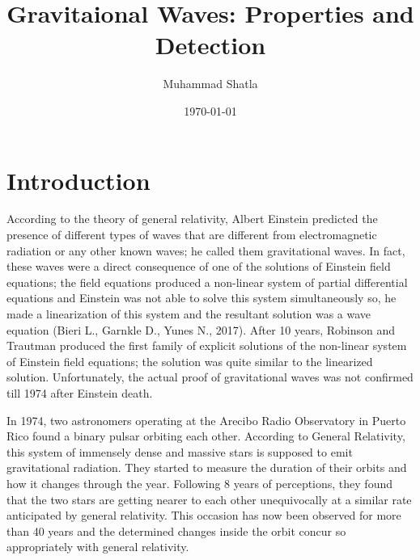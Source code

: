 \documentclass[11]{article}
\begin{document}
\vspace{5cm}
\title{Gravitaional Waves: Properties and Detection}
\author{Muhammad Shatla}
\date{\today}
\maketitle
\newpage
\tableofcontents

\newpage
\section{Introduction}
\setlength{\parindent}{5ex}
According to the theory of general relativity, Albert Einstein predicted the presence of different types of waves that are different from electromagnetic radiation or any other known waves; he called them gravitational waves. In fact, these waves were a direct consequence of one of the solutions of Einstein field equations; the field equations produced a non-linear system of partial differential equations and Einstein was not able to solve this system simultaneously so, he made a linearization of this system and the resultant solution was a wave equation (Bieri L., Garnkle D., Yunes N., 2017). After 10 years, Robinson and Trautman produced the first family of explicit solutions of the non-linear system of Einstein field equations; the solution was quite similar to the linearized solution. Unfortunately, the actual proof of gravitational waves was not confirmed till 1974 after Einstein death.
   
\vspace{5mm}
   In 1974, two astronomers operating at the Arecibo Radio Observatory in Puerto Rico found a binary pulsar orbiting each other. According to General Relativity, this system of immensely dense and massive stars is supposed to emit gravitational radiation. They started to measure the duration of their orbits and how it changes through the year. Following 8 years of perceptions, they found that the two stars are getting nearer to each other unequivocally at a similar rate anticipated by general relativity. This occasion has now been observed for more than 40 years and the determined changes inside the orbit concur so appropriately with general relativity.
   
\end{document}
